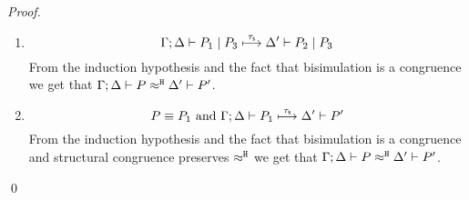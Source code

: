 \begin{proof}
\begin{enumerate}
		\item  %
		\[
			\Gamma; \Delta \vdash P_1 \;|\; P_3 \stackrel{\tau_{\mathsf{s}}}{\longmapsto} \Delta' \vdash P_2 \;|\; P_3
		\]
		\noi From the induction hypothesis and the fact that bisimulation is a congruence
		we get that $\Gamma; \Delta \vdash P \approx^\mathtt{H} \Delta' \vdash P'$.

		\item   %
			\[
				P \equiv P_1 \text{ and }\Gamma; \Delta \vdash P_1 \stackrel{\tau_{\mathsf{s}}}{\longmapsto} \Delta' \vdash P'
			\]
%
		From the induction hypothesis and the fact that bisimulation is a congruence 
		and structural congruence preserves $\approx^\mathtt{H}$
		we get that $\Gamma; \Delta \vdash P \approx^\mathtt{H} \Delta' \vdash P'$.
	\end{enumerate}
	\qed
\end{proof}


